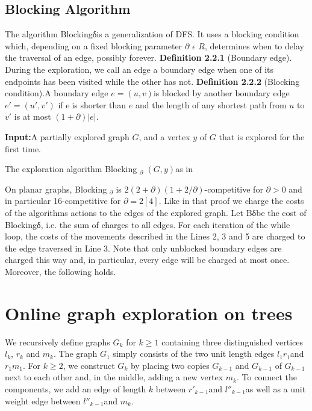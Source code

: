 \documentclass{report}
\begin{document}
    \section{Blocking Algorithm}
    The algorithm Blockingδis a generalization of DFS. It uses a blocking condition which, depending on a fixed blocking parameter $\partial$  $\epsilon$  $R$, determines when to delay the traversal of an edge, possibly forever.
    \newline\newline
    \textbf{Definition 2.2.1} (Boundary edge). During the exploration, we call an edge a boundary edge when one of its endpoints has been visited while the other has not.
    \newline\newline
    \textbf{Definition 2.2.2} (Blocking condition).A boundary edge $e =(u, v)$is blocked by another boundary edge $e'=(u', v')$ if eis shorter than $e$ and the length of any shortest path from $u$ to $v'$ is at most $(1 +\partial )|e|$.
    \newline
    \newline
    \begin{algorithm}[H]
    \SetAlgoLined
     \textbf{Input:}A partially explored graph $G$, and a vertex $y$ of $G$ that is explored for the first time.\;
    \caption{The exploration algorithm Blocking $_\partial$ $(G, y)$as in}
    \end{algorithm}
    \bigskip
    On planar graphs, Blocking $_\partial$ is $2(2 +\partial)(1 +2/\partial)$-competitive for $\partial  >0$ and in particular 16-competitive for $\partial=2[4]$. Like in that proof we charge the costs of the algorithms actions to the edges of the explored graph. Let Bδbe the cost of Blockingδ, i.e. the sum of charges to all edges. For each iteration of the while loop, the costs of the movements described in the Lines 2, 3 and 5 are charged to the edge traversed in Line 3. Note that only unblocked boundary edges are charged this way and, in particular, every edge will be charged at most once. Moreover, the following holds.
    
    \chapter{Online graph exploration on trees}
    We recursively define graphs $G_k$ for $k \geq 1$ containing three distinguished vertices $l_k$, $r_k$ and $m_k$. The graph $G_1$ simply consists of the two unit length edges $l_1r_1$and $r_1m_1$. For $k \geq 2$, we construct $G_k$ by placing two copies $G_{k-1}$ and $G_{k-1}$ of $G_{k-1}$next to each other and, in the middle, adding a new vertex $m_k$. To connect the components, we add an edge of length $k$ between $r'_{k-1}$and $l''_{k-1}$as well as a unit weight edge between $l''_{k-1}$and $m_{k}$.
    
\end{document}
